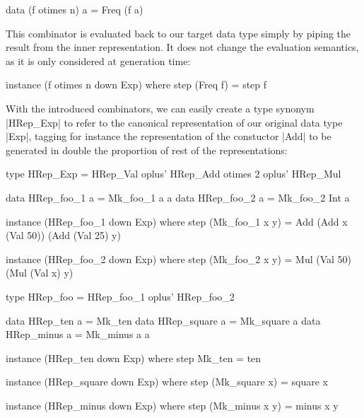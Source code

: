 \begin{code}
data (f otimes n) a = Freq (f a)
\end{code}

This combinator is evaluated back to our target data type simply by piping the
result from the inner representation.
%
It does not change the evaluation semantics, as it is only considered at
generation time:

\begin{code}
instance (f otimes n down Exp) where
  step (Freq f) = step f
\end{code}

With the introduced combinators, we can easily create a type synonym |HRep_Exp|
to refer to the canonical representation of our original data type |Exp|,
tagging for instance the representation of the constuctor |Add| to be generated
in double the proportion of rest of the representations:

\begin{code}
type HRep_Exp  =       HRep_Val
               oplus'  HRep_Add  otimes 2
               oplus'  HRep_Mul
\end{code}



\begin{code}
data HRep_foo_1  a = Mk_foo_1 a a
data HRep_foo_2  a = Mk_foo_2 Int a
\end{code}

\begin{code}
instance (HRep_foo_1 down Exp) where
  step (Mk_foo_1 x y)
    = Add (Add x (Val 50)) (Add (Val 25) y)

instance (HRep_foo_2 down Exp) where
  step (Mk_foo_2 x y)
    = Mul (Val 50) (Mul (Val x) y)
\end{code}

\begin{code}
type HRep_foo  =       HRep_foo_1
               oplus'  HRep_foo_2
\end{code}


\begin{code}
data HRep_ten       a = Mk_ten
data HRep_square    a = Mk_square   a
data HRep_minus     a = Mk_minus    a a
\end{code}

\begin{code}
instance (HRep_ten down Exp) where
  step Mk_ten = ten

instance (HRep_square down Exp) where
  step (Mk_square x) = square x

instance (HRep_minus down Exp) where
  step (Mk_minus x y) = minus x y
\end{code}


